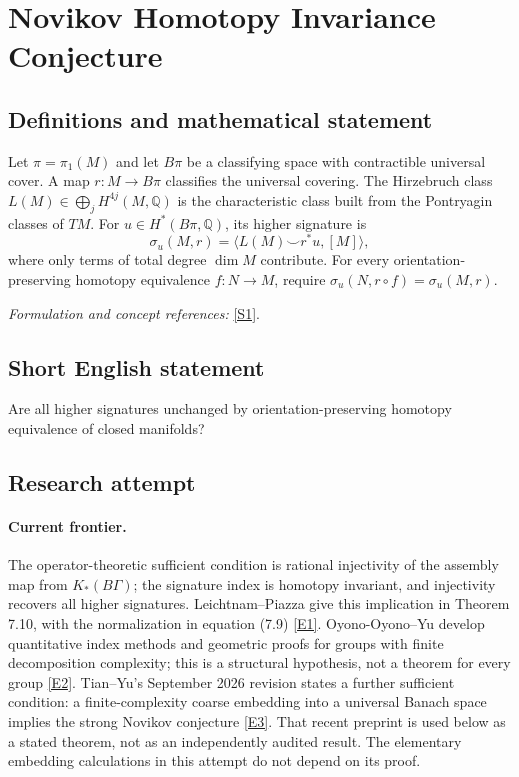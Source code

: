 \documentclass[11pt,a4paper]{article}
\newcommand{\Q}{\mathbb{Q}}
\newcommand{\sref}[2]{\hyperlink{source:#1:#2}{[S#2]}}
\newcommand{\eref}[2]{\hyperlink{extra:#1:#2}{[E#2]}}
\newif\ifshowcatalogue
\newcommand{\cataloguescope}[1]{\ifshowcatalogue
 \paragraph{Exact scope in the supplied catalogue.}
 \begin{quote}\small #1\end{quote}\fi}
\numberwithin{equation}{section}
\begin{document}
\setcounter{section}{0}
\clearpage
\section*{\texorpdfstring{Novikov Homotopy Invariance Conjecture}{Novikov Homotopy Invariance Conjecture}}\label{statement}
\subsection{Definitions and mathematical statement}
Let $\pi=\pi_1(M)$ and let $B\pi$ be a classifying space with contractible universal cover. A map $r:M\to B\pi$ classifies the universal covering. The Hirzebruch class $L(M)\in\bigoplus_jH^{4j}(M,\Q)$ is the characteristic class built from the Pontryagin classes of $TM$. For $u\in H^*(B\pi,\Q)$, its higher signature is
\[
 \sigma_u(M,r)=\langle L(M)\smile r^*u,[M]\rangle,
\]
where only terms of total degree $\dim M$ contribute. For every orientation-preserving homotopy equivalence $f:N\to M$, require $\sigma_u(N,r\circ f)=\sigma_u(M,r)$.
\par\smallskip\textit{Formulation and concept references:} \sref{statement}{1}.
\cataloguescope{For every closed oriented smooth manifold M, every u in H\textasciicircum{}*(B pi\_1(M); Q), and every classifying map r, prove that the higher signature <L(M) cup r\textasciicircum{}*u,[M]> is invariant under orientation-preserving homotopy equivalence.}
\subsection{Short English statement}
Are all higher signatures unchanged by orientation-preserving homotopy equivalence of closed manifolds?
\subsection{Research attempt}

\paragraph{Current frontier.}
The operator-theoretic sufficient condition is rational injectivity of the assembly map from $K_*(B\Gamma)$; the signature index is homotopy invariant, and injectivity recovers all higher signatures. Leichtnam--Piazza give this implication in Theorem 7.10, with the normalization in equation (7.9) \eref{statement}{1}. Oyono-Oyono--Yu develop quantitative index methods and geometric proofs for groups with finite decomposition complexity; this is a structural hypothesis, not a theorem for every group \eref{statement}{2}. Tian--Yu's September 2026 revision states a further sufficient condition: a finite-complexity coarse embedding into a universal Banach space implies the strong Novikov conjecture \eref{statement}{3}. That recent preprint is used below as a stated theorem, not as an independently audited result. The elementary embedding calculations in this attempt do not depend on its proof.
\end{document}

